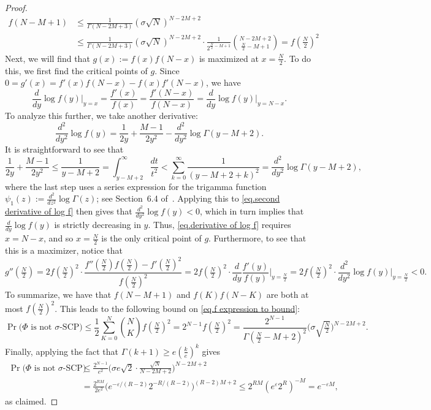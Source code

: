 \documentclass[times,10pt]{elsarticle}
\theoremstyle{plain}
\begin{document}
\begin{proof}
\begin{align*}
f(N-M+1)
&\leq\frac{1}{\Gamma(N-2M+3)}(\sigma\sqrt{N})^{N-2M+2}\\
&\leq\frac{1}{\Gamma(N-2M+3)}(\sigma\sqrt{N})^{N-2M+2}\cdot\frac{1}{2^{\frac{N}{2}-M+1}}\binom{N-2M+2}{\frac{N}{2}-M+1}
=f(\tfrac{N}{2})^2
\end{align*}
Next, we will find that $g(x):=f(x)f(N-x)$ is maximized at $x=\frac{N}{2}$.
To do this, we first find the critical points of $g$.
Since $0=g'(x)=f'(x)f(N-x)-f(x)f'(N-x)$, we have
\begin{equation}
\label{eq.derivative of log f}
\frac{d}{dy}\log f(y)\bigg|_{y=x}
=\frac{f'(x)}{f(x)}
=\frac{f'(N-x)}{f(N-x)}
=\frac{d}{dy}\log f(y)\bigg|_{y=N-x}.
\end{equation}
To analyze this further, we take another derivative:
\begin{equation}
\label{eq.second derivative of log f}
\frac{d^2}{dy^2}\log f(y)
=\frac{1}{2y}+\frac{M-1}{2y^2}-\frac{d^2}{dy^2}\log\Gamma(y-M+2).
\end{equation}
It is straightforward to see that
\begin{equation*}
\frac{1}{2y}+\frac{M-1}{2y^2}
\leq\frac{1}{y-M+2}
=\int_{y-M+2}^\infty\frac{dt}{t^2}
<\sum_{k=0}^\infty\frac{1}{(y-M+2+k)^2}
=\frac{d^2}{dy^2}\log\Gamma(y-M+2),
\end{equation*}
where the last step uses a series expression for the trigamma function $\psi_1(z):=\frac{d^2}{dz^2}\log\Gamma(z)$; see Section~6.4 of~\cite{AbramowitzS:64}.
Applying this to \eqref{eq.second derivative of log f} then gives that $\frac{d^2}{dy^2}\log f(y)<0$, which in turn implies that $\frac{d}{dy}\log f(y)$ is strictly decreasing in $y$.
Thus, \eqref{eq.derivative of log f} requires $x=N-x$, and so $x=\frac{N}{2}$ is the only critical point of $g$.
Furthermore, to see that this is a maximizer, notice that
\begin{equation*}
g''(\tfrac{N}{2})
=2f(\tfrac{N}{2})^2\cdot\frac{f''(\tfrac{N}{2})f(\tfrac{N}{2})-f'(\tfrac{N}{2})^2}{f(\tfrac{N}{2})^2}
=2f(\tfrac{N}{2})^2\cdot\frac{d}{dy}\frac{f'(y)}{f(y)}\bigg|_{y=\frac{N}{2}}
=2f(\tfrac{N}{2})^2\cdot\frac{d^2}{dy^2}\log f(y)\bigg|_{y=\frac{N}{2}}
<0.
\end{equation*}
To summarize, we have that $f(N-M+1)$ and $f(K)f(N-K)$ are both at most $f(\tfrac{N}{2})^2$.
This leads to the following bound on \eqref{eq.f expression to bound}:
\begin{equation*}
\operatorname{Pr}\Big(\Phi\mbox{ is not $\sigma$-SCP}\Big)
\leq\frac{1}{2}\sum_{K=0}^{N}\binom{N}{K}f(\tfrac{N}{2})^2
=2^{N-1}f(\tfrac{N}{2})^2
=\frac{2^{N-1}}{\Gamma(\frac{N}{2}-M+2)^2}\Big(\sigma\sqrt{\tfrac{N}{2}}\Big)^{N-2M+2}.
\end{equation*}
Finally, applying the fact that $\Gamma(k+1)\geq e(\frac{k}{e})^k$ gives
\begin{align*}
\operatorname{Pr}\Big(\Phi\mbox{ is not $\sigma$-SCP}\Big)
&\leq\frac{2^{N-1}}{e^2}\bigg(\sigma e\sqrt{2}\cdot\frac{\sqrt{N}}{N-2M+2}\bigg)^{N-2M+2}\\
&=\frac{2^{RM}}{2e^2}\Big(e^{-\varepsilon/(R-2)}2^{-R/(R-2)}\Big)^{(R-2)M+2}
\leq 2^{RM}(e^{\varepsilon}2^R)^{-M}
=e^{-\varepsilon M},
\end{align*}
as claimed.
\qquad
\end{proof}
\end{document}
